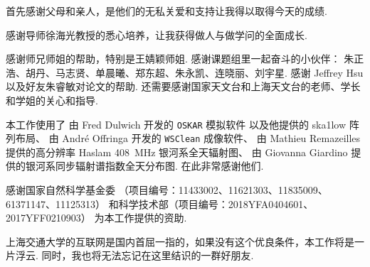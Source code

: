 
\begin{thanks}

首先感谢父母和亲人，是他们的无私关爱和支持让我得以取得今天的成绩.

感谢导师徐海光教授的悉心培养，让我获得做人与做学问的全面成长.

感谢师兄师姐的帮助，特别是王婧颖师姐.
感谢课题组里一起奋斗的小伙伴：
朱正浩、胡丹、马志贤、单晨曦、郑东超、朱永凯、连晓丽、刘宇星.
感谢 Jeffrey Hsu 以及好友朱睿敏对论文的帮助.
还需要感谢国家天文台和上海天文台的老师、学长和学姐的关心和指导.

本工作使用了
由 Fred Dulwich 开发的 \texttt{OSKAR} 模拟软件
以及他提供的 \acs{ska1low} 阵列布局、
由 André Offringa 开发的 \texttt{WSClean} 成像软件、
由 Mathieu Remazeilles 提供的高分辨率 Haslam \SI{408}{\MHz}
银河系全天辐射图、
由 Giovanna Giardino 提供的银河系同步辐射谱指数全天分布图.
在此非常感谢他们.

感谢国家自然科学基金委
（项目编号：11433002、11621303、11835009、61371147、11125313）
和科学技术部（项目编号：2018YFA0404601、2017YFF0210903）
为本工作提供的资助.

上海交通大学的互联网是国内首屈一指的，如果没有这个优良条件，本工作将是一片浮云.
同时，我也将无法忘记在这里结识的一群好朋友.


\end{thanks}
